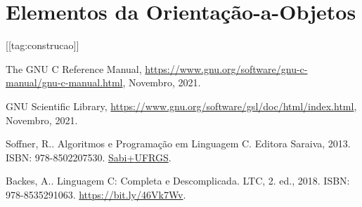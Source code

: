 \documentclass[12pt]{article}
\begin{document}
\section{Elementos da Orientação-a-Objetos}\label{sec_oo}

[[tag:construcao]]


\ifisbook
\clearpage
{}
{}
\fi

\nocite{*}
\begin{thebibliography}{99}

  The GNU C Reference Manual, \url{https://www.gnu.org/software/gnu-c-manual/gnu-c-manual.html}, Novembro, 2021.
  
  GNU Scientific Library, \url{https://www.gnu.org/software/gsl/doc/html/index.html}, Novembro, 2021.
  
  Soffner, R.. Algoritmos e Programação em Linguagem C. Editora Saraiva, 2013. ISBN: 978-8502207530. \href{https://bit.ly/45VccHe}{Sabi{+}UFRGS}.

  Backes, A.. Linguagem C: Completa e Descomplicada. LTC, 2. ed., 2018. ISBN: 978-8535291063. \href{Sabi{+}UFRGS}{https://bit.ly/46Vk7Wv}.
  
\end{thebibliography}
\end{document}
